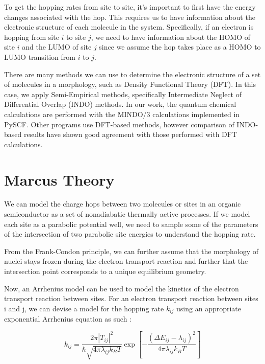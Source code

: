 \documentclass{article}
\begin{document}
To get the hopping rates from site to site, it's important to first have the energy changes associated with the hop. This requires us to have information about the electronic structure of each molecule in the system. Specifically, if an electron is hopping from site $i$ to site $j$, we need to have information about the HOMO of site $i$ and the LUMO of site $j$ since we assume the hop takes place as a HOMO to LUMO transition from $i$ to $j$. 

There are many methods we can use to determine the electronic structure of a set of molecules in a morphology, such as Density Functional Theory (DFT). In this case, we apply Semi-Empirical methods, specifically Intermediate Neglect of Differential Overlap (INDO) methods. In our work, the quantum chemical calculations are performed with the MINDO/3 calculations implemented in PySCF. Other programs use DFT-based methods, however comparison of INDO-based results have shown good agreement with those performed with DFT calculations. 



\section{Marcus Theory}


We can model the charge hops between two molecules or sites in an organic semiconductor as a set of nonadiabatic thermally active processes. If we model each site as a parabolic potential well, we need to sample some of the parameters of the intersection of two parabolic site energies to understand the hopping rate.

From the Frank-Condon principle, we can further assume that the morphology of nuclei stays frozen during the electron transport reaction and further that the intersection point corresponds to a unique equilibrium geometry.


Now, an Arrhenius model can be used to model the kinetics of the electron transport reaction between sites. For an electron transport reaction between sites i and j, we can devise a model for the hopping rate $k_{ij}$ using an appropriate exponential Arrhenius equation as such :

$$k_{ij} = \frac{2 \pi |T_{ij}|^2}{\hbar \sqrt{4 \pi \lambda_{ij} k_{B} T}} \exp\left[-\frac{(\Delta E_{ij} - \lambda_{ij})^2}{4 \pi \lambda_{ij} k_{B} T}\right]$$
\end{document}
